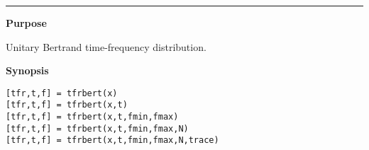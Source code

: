 

\renewcommand{\footnoterule}{}
\hspace*{-1.6cm}{\Large \bf tfrbert}

\vspace*{-.4cm}
\hspace*{-1.6cm}\rule[0in]{16.5cm}{.02cm}
\vspace*{.2cm}

{\bf \large {}\selectfont Purpose}\\
\hspace*{1.5cm}
\begin{minipage}[t]{13.5cm}
Unitary Bertrand time-frequency distribution.
\end{minipage}
\vspace*{.5cm}

{\bf \large {}\selectfont Synopsis}\\
\hspace*{1.5cm}
\begin{minipage}[t]{13.5cm}
\begin{verbatim}
[tfr,t,f] = tfrbert(x)
[tfr,t,f] = tfrbert(x,t)
[tfr,t,f] = tfrbert(x,t,fmin,fmax)
[tfr,t,f] = tfrbert(x,t,fmin,fmax,N)
[tfr,t,f] = tfrbert(x,t,fmin,fmax,N,trace)
\end{verbatim}
\end{minipage}
\vspace*{.5cm}

